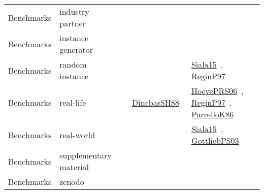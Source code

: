 {\begin{longtable}{lp{3cm}>{\raggedright\arraybackslash}p{6cm}>{\raggedright\arraybackslash}p{6cm}>{\raggedright\arraybackslash}p{8cm}}
Benchmarks & industry partner &  &  & \\
Benchmarks & instance generator &  &  & \\
Benchmarks & random instance &  &  & \href{cars/works/Siala15.pdf}{Siala15}~\cite{Siala15}, \href{cars/works/ReginP97.pdf}{ReginP97}~\cite{ReginP97}\\
Benchmarks & real-life &  & \href{cars/works/DincbasSH88.pdf}{DincbasSH88}~\cite{DincbasSH88} & \href{cars/works/HoevePRS06.pdf}{HoevePRS06}~\cite{HoevePRS06}, \href{cars/works/ReginP97.pdf}{ReginP97}~\cite{ReginP97}, \href{cars/works/ParrelloK86.pdf}{ParrelloK86}~\cite{ParrelloK86}\\
Benchmarks & real-world &  &  & \href{cars/works/Siala15.pdf}{Siala15}~\cite{Siala15}, \href{cars/works/GottliebPS03.pdf}{GottliebPS03}~\cite{GottliebPS03}\\
Benchmarks & supplementary material &  &  & \\
Benchmarks & zenodo &  &  & \\
\end{longtable}
}


